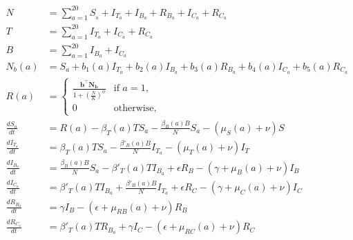 \documentclass[letterpaper,12pt]{article}
\begin{document}
\begin{align*}
N & = \sum_{a=1}^{20} S_{_a} + I_{T_a} + I_{B_a} + R_{B_a} + I_{C_a} + R_{C_a} \\
T &=  \sum_{a=1}^{20} I_{T_a} + I_{C_a} + R_{C_a} \\
B &=  \sum_{a=1}^{20} I_{B_a}+I_{C_a} \\
N_{b}(a) &= S_a + b_1(a) I_{T_a}+ b_2(a) I_{B_a} + b_3(a) R_{B_a} + b_4(a) I_{C_a} + b_5(a) R_{C_a} \\
R(a) &= \begin{cases}
    \frac{\mathbf{b}^\top \mathbf{N_b}}{1+(\frac{N}{K})^\phi}  & \text{if $a = 1$},
    \\
    0 & \text{otherwise},
  \end{cases} \\
\frac{dS_a}{dt} &= R(a) - \beta_{T}{(a)} T S_a - \frac{\beta_B (a) B}{N} S_a - (\mu_{S}(a) + \nu) S  \\ %
\frac{dI_{T_a}}{dt}&= \beta_T (a) T S_a -  \frac{\beta'_{B}(a) B}{N} I_{T_a} - (\mu_{T}(a) + \nu) I_{T} \\						%
\frac{dI_{B_a}}{dt}&=  \frac{\beta_B (a) B}{N}S_a - \beta'_{T}(a) T I_{B_a} + \epsilon R_{B}  - (\gamma + \mu_{B}(a) + \nu) I_{B} \\ %
\frac{dI_{C_a}}{dt}&=  \beta'_{T}(a) T I_{B_a} + \frac{\beta'_{B}(a) B}{N} I_{T_a} + \epsilon R_{C}  - (\gamma + \mu_{C}(a) + \nu)I_{C}\\  %
\frac{dR_{B_a}}{dt}&=  \gamma I_{B} - (\epsilon + \mu_{RB}(a) + \nu) R_{B} \\  									%
\frac{dR_{C_a}}{dt}&=  \beta'_{T}(a) T R_{B_a} + \gamma I_{C} - (\epsilon + \mu_{RC}(a) + \nu) R_{C} \\ 		%
\end{align*}
\end{document}
